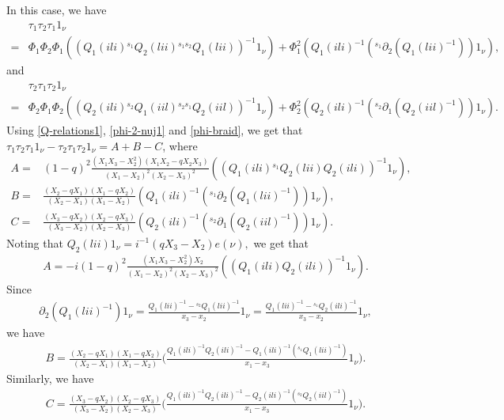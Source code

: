 \documentclass[11pt, reqno]{amsart} \textwidth=14.9cm \oddsidemargin=1cm \evensidemargin=1cm
\theoremstyle{definition}
\numberwithin{equation}{section}
\begin{document}
\vspace{0.3cm}\noindent In this case, we have
\begin{align*}
&\tau_{1}\tau_{2}\tau_{1}1_{\nu}\\
=&\Phi_{1}\Phi_{2}\Phi_{1}((Q_{1}(ili){}^{s_{1}}Q_{2}(lii){}^{s_{1}s_{2}}Q_{1}(lii))^{-1}1_{\nu})
+\Phi_{1}^{2}(Q_{1}(ili)^{-1}({}^{s_{1}}\partial_{2}(Q_1(lii)^{-1}))1_{\nu}),
\end{align*}
and
\begin{align*}
&\tau_{2}\tau_{1}\tau_{2}1_{\nu}\\
=&\Phi_{2}\Phi_{1}\Phi_{2}((Q_{2}(ili){}^{s_{2}}Q_{1}(iil){}^{s_{2}s_{1}}Q_{2}(iil))^{-1}1_{\nu})
+\Phi_{2}^{2}(Q_{2}(ili)^{-1}({}^{s_{2}}\partial_{1}(Q_2(iil)^{-1}))1_{\nu}).
\end{align*}
Using \eqref{Q-relations1}, \eqref{phi-2-nuj1} and \eqref{phi-braid}, we get that $\tau_{1}\tau_{2}\tau_{1}1_{\nu}-\tau_{2}\tau_{1}\tau_{2}1_{\nu}=A+B-C$, where
\begin{align*}
A=&(1-q)^2\frac{(X_1X_{3}-X_{2}^2)(X_1 X_{2}-qX_{2}X_{3})}{(X_1-X_{2})^2(X_{2}-X_{3})^2}((Q_{1}(ili){}^{s_{1}}Q_{2}(lii)Q_{2}(ili))^{-1}1_{\nu}),\\
B=&\frac{(X_{2}-qX_1)(X_1-qX_{2})}{(X_{2}-X_{1})(X_{1}-X_{2})}(Q_{1}(ili)^{-1}({}^{s_{1}}\partial_{2}(Q_1(lii)^{-1}))1_{\nu}),\\
C=&\frac{(X_{3}-qX_2)(X_2-qX_{3})}{(X_{3}-X_{2})(X_{2}-X_{3})}(Q_{2}(ili)^{-1}({}^{s_{2}}\partial_{1}(Q_2(iil)^{-1}))1_{\nu}).
\end{align*}
Noting that $Q_{2}(lii)1_{\nu}=i^{-1}(qX_{3}-X_{2})e(\nu),$ we get that
\begin{align*}
A=-i(1-q)^2\frac{(X_1X_{3}-X_{2}^2)X_{2}}{(X_1-X_{2})^2(X_{2}-X_{3})^2}((Q_{1}(ili)Q_{2}(ili))^{-1}1_{\nu}).
\end{align*}
Since
\begin{align*}\partial_{2}(Q_1(lii)^{-1})1_{\nu}=\frac{Q_1(lii)^{-1}-{}^{s_{2}}Q_1(lii)^{-1}}{x_{3}-x_{2}}1_{\nu}=
\frac{Q_1(lii)^{-1}-{}^{s_{1}}Q_2(ili)^{-1}}{x_{3}-x_{2}}1_{\nu},
\end{align*}
we have
\begin{align*}
B=\frac{(X_{2}-qX_1)(X_1-qX_{2})}{(X_{2}-X_{1})(X_{1}-X_{2})}\big(\frac{Q_{1}(ili)^{-1}Q_{2}(ili)^{-1}-
Q_{1}(ili)^{-1}({}^{s_{1}}Q_{1}(lii)^{-1})}{x_{1}-x_{3}}1_{\nu}\big).
\end{align*}
Similarly, we have
\begin{align*}
C=\frac{(X_{3}-qX_2)(X_2-qX_{3})}{(X_{3}-X_{2})(X_{2}-X_{3})}\big(\frac{Q_{1}(ili)^{-1}Q_{2}(ili)^{-1}-
Q_{2}(ili)^{-1}({}^{s_{2}}Q_{2}(iil)^{-1})}{x_{1}-x_{3}}1_{\nu}\big).
\end{align*}
\end{document}
